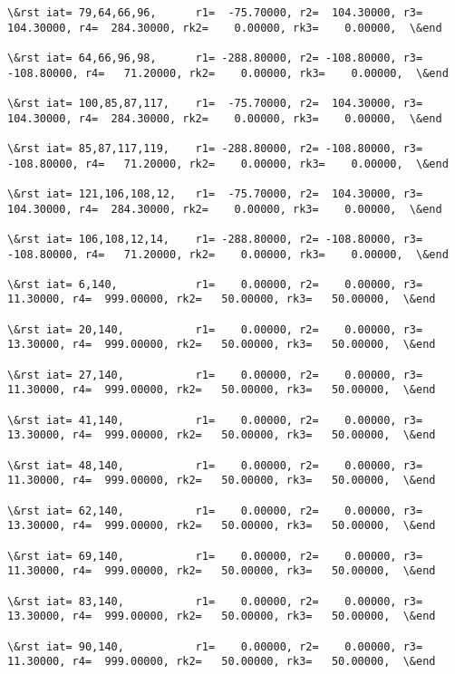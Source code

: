 \documentclass[11pt]{article}
\begin{document}
\begin{Verbatim}[commandchars=\\\{\}]
\&rst iat= 79,64,66,96,      r1=  -75.70000, r2=  104.30000, r3=  104.30000, r4=  284.30000, rk2=    0.00000, rk3=    0.00000,  \&end

\&rst iat= 64,66,96,98,      r1= -288.80000, r2= -108.80000, r3= -108.80000, r4=   71.20000, rk2=    0.00000, rk3=    0.00000,  \&end

\&rst iat= 100,85,87,117,    r1=  -75.70000, r2=  104.30000, r3=  104.30000, r4=  284.30000, rk2=    0.00000, rk3=    0.00000,  \&end

\&rst iat= 85,87,117,119,    r1= -288.80000, r2= -108.80000, r3= -108.80000, r4=   71.20000, rk2=    0.00000, rk3=    0.00000,  \&end

\&rst iat= 121,106,108,12,   r1=  -75.70000, r2=  104.30000, r3=  104.30000, r4=  284.30000, rk2=    0.00000, rk3=    0.00000,  \&end

\&rst iat= 106,108,12,14,    r1= -288.80000, r2= -108.80000, r3= -108.80000, r4=   71.20000, rk2=    0.00000, rk3=    0.00000,  \&end

\&rst iat= 6,140,            r1=    0.00000, r2=    0.00000, r3=   11.30000, r4=  999.00000, rk2=   50.00000, rk3=   50.00000,  \&end

\&rst iat= 20,140,           r1=    0.00000, r2=    0.00000, r3=   13.30000, r4=  999.00000, rk2=   50.00000, rk3=   50.00000,  \&end

\&rst iat= 27,140,           r1=    0.00000, r2=    0.00000, r3=   11.30000, r4=  999.00000, rk2=   50.00000, rk3=   50.00000,  \&end

\&rst iat= 41,140,           r1=    0.00000, r2=    0.00000, r3=   13.30000, r4=  999.00000, rk2=   50.00000, rk3=   50.00000,  \&end

\&rst iat= 48,140,           r1=    0.00000, r2=    0.00000, r3=   11.30000, r4=  999.00000, rk2=   50.00000, rk3=   50.00000,  \&end

\&rst iat= 62,140,           r1=    0.00000, r2=    0.00000, r3=   13.30000, r4=  999.00000, rk2=   50.00000, rk3=   50.00000,  \&end

\&rst iat= 69,140,           r1=    0.00000, r2=    0.00000, r3=   11.30000, r4=  999.00000, rk2=   50.00000, rk3=   50.00000,  \&end

\&rst iat= 83,140,           r1=    0.00000, r2=    0.00000, r3=   13.30000, r4=  999.00000, rk2=   50.00000, rk3=   50.00000,  \&end

\&rst iat= 90,140,           r1=    0.00000, r2=    0.00000, r3=   11.30000, r4=  999.00000, rk2=   50.00000, rk3=   50.00000,  \&end


\end{Verbatim}
\end{document}
